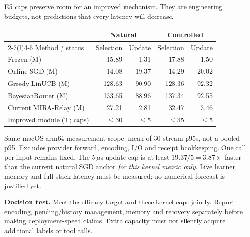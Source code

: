 \documentclass[10pt,letterpaper]{article}
\newcommand{\T}[1]{{\color{GuideBlue}#1}}
\newcommand{\note}[1]{{\fontsize{8.5}{10.5}\selectfont #1\par}}
\newcommand{\sectionhead}[1]{\vspace{7pt}{\large\bfseries #1}\par\vspace{3pt}}
\newenvironment{clean}{\begin{center}\fontsize{9.5}{11.5}\selectfont\setlength{\tabcolsep}{8pt}\renewcommand{\arraystretch}{1.10}}{\end{center}}
\begin{document}
\newpage
\sectionhead{4. Retain efficiency while adding useful capacity}
E5 caps preserve room for an improved mechanism. They are engineering budgets, not predictions that every latency will decrease.
\begin{clean}
\begin{tabular}{@{}lrrrr@{}}
\toprule
& \multicolumn{2}{c}{Natural} & \multicolumn{2}{c}{Controlled} \\
\cmidrule(lr){2-3}\cmidrule(l){4-5}
Method / status & Selection & Update & Selection & Update \\
\midrule
Frozen (M) & 15.89 & 1.31 & 17.88 & 1.50 \\
Online SGD (M) & 14.08 & 19.37 & 14.29 & 20.02 \\
Greedy LinUCB (M) & 128.63 & 90.90 & 128.36 & 92.32 \\
BayesianRouter (M) & 133.65 & 88.96 & 137.34 & 92.55 \\
Current MIRA-Relay (M) & 27.21 & 2.81 & 32.47 & 3.46 \\
\midrule
\T{Improved module (T; caps)} & \T{$\leq30$} & \T{$\leq5$} & \T{$\leq35$} & \T{$\leq5$} \\

\bottomrule
\end{tabular}
\end{clean}
\note{Same macOS arm64 measurement scope; mean of 30 stream p95s, not a pooled p95. Excludes provider forward, encoding, I/O and receipt bookkeeping. One call per input remains fixed. The 5\,$\mu$s update cap is at least $19.37/5=3.87\times$ faster than the current natural SGD anchor \emph{for this kernel metric only}. Live learner memory and full-stack latency must be measured; no numerical forecast is justified yet.}
\textbf{Decision test.} Meet the efficacy target and these kernel caps jointly. Report encoding, pending/history management, memory and recovery separately before making deployment-speed claims. Extra capacity must not silently acquire additional labels or tool calls.
\end{document}
